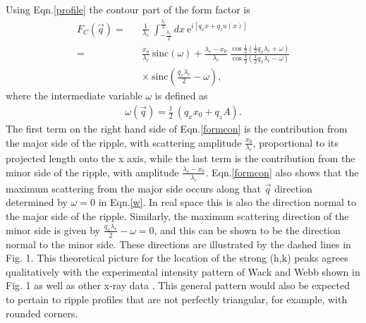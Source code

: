 Using Eqn.\ref{profile} the contour part of the form factor is
\begin{eqnarray}
\label{formcon}
F_C(\vec{q}) =&& \frac{1}{\lambda_r}\ \int_{- \frac{\lambda_r}
{2}}^{\frac{\lambda_r}{2}} dx\ \mbox{e}^{i [q_x x + q_z u(x)]}\nonumber \\ 
=&& \frac{x_0}{\lambda_r}\ \mbox{sinc}(\omega)
+ \frac{\lambda_r - x_0}{\lambda_r}\ \frac{\cos \frac{1}{2} (\frac{1}{2}
q_x \lambda_r + \omega)}{\cos \frac{1}{2} (\frac{1}{2} q_x \lambda_r -
\omega)}\nonumber\\ 
&& \times\ \mbox{sinc}(\frac{q_x \lambda_r}{2} - \omega ),
\end{eqnarray}
where the intermediate variable $\omega$ is defined as
\begin{eqnarray}
\label{w}
\omega (\vec{q}) = \frac{1}{2}\ ( q_x x_0 + q_z A).
\end{eqnarray}
The first term on the right hand side of Eqn.\ref{formcon} is the contribution 
from the major side of the ripple, with scattering amplitude
\(\frac{x_0}{\lambda_r}\), proportional to its projected length onto the
x axis, while the last term is the contribution from the 
minor side of the ripple, with amplitude \(\frac{\lambda_r - x_0}{\lambda_r}\).
Eqn.\ref{formcon} also shows that the maximum scattering 
from the major side occurs along that $\vec{q}$ direction determined by
$\omega = 0$ in Eqn.\ref{w}.  In real space this is also the direction normal to
the major side of the ripple.  Similarly, the maximum scattering
direction of the minor side is given by \( \frac{q_x \lambda_r}{2} - \omega 
= 0 \), and this can be shown to be the direction normal to the minor side.
These directions are illustrated by the dashed lines in Fig. 1.  
This theoretical picture for the location of the strong (h,k) peaks
agrees qualitatively with the experimental intensity pattern of Wack and
Webb \cite{Wac89a} shown in Fig. 1 as well as other x-ray data
\cite{Ale85,Kat95}.  This general pattern would also be expected to
pertain to ripple profiles that are not perfectly triangular, for example,
with rounded corners.

